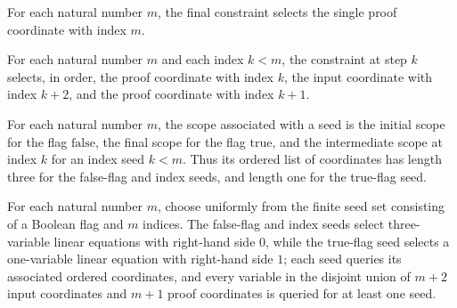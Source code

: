 \begin{definition}
\label{FABL.oddWeightPartialSumFinalCSPScope}
\leanok
{}
For each natural number $m$, the final constraint selects the single proof coordinate
with index $m$.
\end{definition}

\begin{definition}
\label{FABL.oddWeightPartialSumStepCSPScope}
\leanok
{}
For each natural number $m$ and each index $k<m$, the constraint at step $k$ selects, in
order, the proof coordinate with index $k$, the input coordinate with index $k+2$, and
the proof coordinate with index $k+1$.
\end{definition}

\begin{definition}
\label{FABL.oddWeightPartialSumCSPScope}
\leanok
{}
For each natural number $m$, the scope associated with a seed is the initial scope for
the flag $\mathrm{false}$, the final scope for the flag $\mathrm{true}$, and the
intermediate scope at index $k$ for an index seed $k<m$. Thus its ordered list of
coordinates has length three for the false-flag and index seeds, and length one for the
true-flag seed.
\end{definition}

\begin{definition}
\label{FABL.oddWeightPartialSumUniformStringTester}
\leanok
{}
For each natural number $m$, choose uniformly from the finite seed set consisting of a
Boolean flag and $m$ indices. The false-flag and index seeds select three-variable
linear equations with right-hand side $0$, while the true-flag seed selects a
one-variable linear equation with right-hand side $1$; each seed queries its associated
ordered coordinates, and every variable in the disjoint union of $m+2$ input coordinates
and $m+1$ proof coordinates is queried for at least one seed.
\end{definition}

